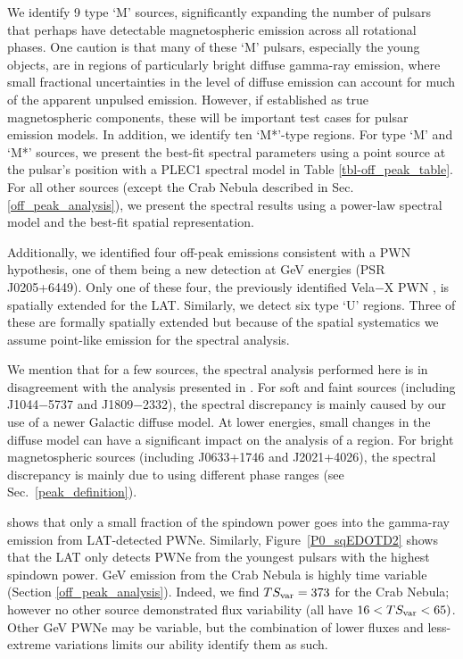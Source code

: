 We identify 9 type `M' sources,
significantly expanding the number of pulsars that perhaps have detectable magnetospheric emission across all rotational phases. 
One caution is that many of these `M' pulsars, especially the young objects, are in regions of particularly bright diffuse gamma-ray
emission, where small fractional uncertainties in the level of diffuse emission can account for much of the apparent unpulsed emission. 
However, if established as true magnetospheric components, these will be important test cases for
pulsar emission models. In addition, we identify ten
`M*'-type regions.
For type `M' and `M*' sources, we present the best-fit spectral parameters using
a point source at the pulsar's position with a PLEC1 spectral model in
Table \ref{tbl-off_peak_table}.  For all other
sources (except the Crab Nebula described in Sec. \ref{off_peak_analysis}), 
we present the spectral results using a power-law spectral
model and the best-fit spatial representation.


Additionally, we identified four off-peak emissions consistent with a PWN
hypothesis, one of them being a new detection at GeV energies (PSR J0205+6449).
Only one of these four, the previously identified Vela$-$X PWN \citep{LAT_collaboration_Vela_X_2010}, is spatially extended for the LAT.
Similarly, we detect six type `U' regions. Three of these are formally 
spatially extended
but because of the spatial systematics 
we assume point-like emission for the spectral analysis.

We mention that for a few sources, the spectral analysis
performed here is in disagreement with the analysis presented in
\citet{LAT_collaboration_PWNCAT_2011}. For soft and faint sources
(including J1044$-$5737 and J1809$-$2332), the spectral discrepancy is
mainly caused by our use of a newer Galactic diffuse model. At lower
energies, small changes in the diffuse model can have a significant
impact on the analysis of a region.  For bright magnetospheric sources
(including J0633+1746 and J2021+4026), the spectral discrepancy is mainly
due to using different phase ranges (see Sec.~\ref{peak_definition}).


 shows that only
a small fraction of the spindown power goes into 
the gamma-ray emission from LAT-detected PWNe.
Similarly, 
Figure~\ref{P0_sqEDOTD2} shows that the LAT only detects
PWNe from the youngest pulsars with the highest spindown power.
GeV emission from the Crab Nebula is highly time variable (Section \ref{off_peak_analysis}).  
Indeed, we find
$TS_{\rm var}=373$ for the Crab Nebula; however
no other source demonstrated flux variability (all have $16 <TS_{\rm var} <65)$.  
Other GeV PWNe may be variable, but the combination of lower fluxes
and less-extreme variations limits our ability identify them as such.



